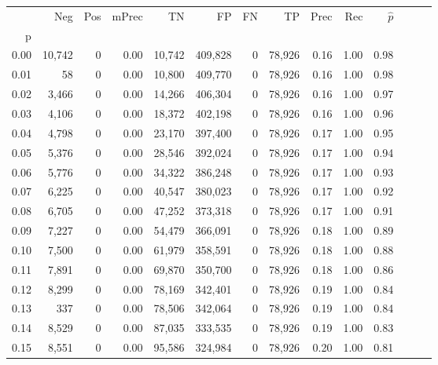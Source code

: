 \begin{tabular}{rrrrrrrrrrrrrr}
\toprule
{} &     Neg &    Pos & mPrec &       TN &       FP &      FN &      TP &  Prec &   Rec & $\hat{p}$ \\
p    &         &        &       &          &          &         &         &       &       &           \\
\midrule
0.00 &  10,742 &      0 &  0.00 &   10,742 &  409,828 &       0 &  78,926 &  0.16 &  1.00 &      0.98 \\
0.01 &      58 &      0 &  0.00 &   10,800 &  409,770 &       0 &  78,926 &  0.16 &  1.00 &      0.98 \\
0.02 &   3,466 &      0 &  0.00 &   14,266 &  406,304 &       0 &  78,926 &  0.16 &  1.00 &      0.97 \\
0.03 &   4,106 &      0 &  0.00 &   18,372 &  402,198 &       0 &  78,926 &  0.16 &  1.00 &      0.96 \\
0.04 &   4,798 &      0 &  0.00 &   23,170 &  397,400 &       0 &  78,926 &  0.17 &  1.00 &      0.95 \\
0.05 &   5,376 &      0 &  0.00 &   28,546 &  392,024 &       0 &  78,926 &  0.17 &  1.00 &      0.94 \\
0.06 &   5,776 &      0 &  0.00 &   34,322 &  386,248 &       0 &  78,926 &  0.17 &  1.00 &      0.93 \\
0.07 &   6,225 &      0 &  0.00 &   40,547 &  380,023 &       0 &  78,926 &  0.17 &  1.00 &      0.92 \\
0.08 &   6,705 &      0 &  0.00 &   47,252 &  373,318 &       0 &  78,926 &  0.17 &  1.00 &      0.91 \\
0.09 &   7,227 &      0 &  0.00 &   54,479 &  366,091 &       0 &  78,926 &  0.18 &  1.00 &      0.89 \\
0.10 &   7,500 &      0 &  0.00 &   61,979 &  358,591 &       0 &  78,926 &  0.18 &  1.00 &      0.88 \\
0.11 &   7,891 &      0 &  0.00 &   69,870 &  350,700 &       0 &  78,926 &  0.18 &  1.00 &      0.86 \\
0.12 &   8,299 &      0 &  0.00 &   78,169 &  342,401 &       0 &  78,926 &  0.19 &  1.00 &      0.84 \\
0.13 &     337 &      0 &  0.00 &   78,506 &  342,064 &       0 &  78,926 &  0.19 &  1.00 &      0.84 \\
0.14 &   8,529 &      0 &  0.00 &   87,035 &  333,535 &       0 &  78,926 &  0.19 &  1.00 &      0.83 \\
0.15 &   8,551 &      0 &  0.00 &   95,586 &  324,984 &       0 &  78,926 &  0.20 &  1.00 &      0.81 \\

\end{tabular}

